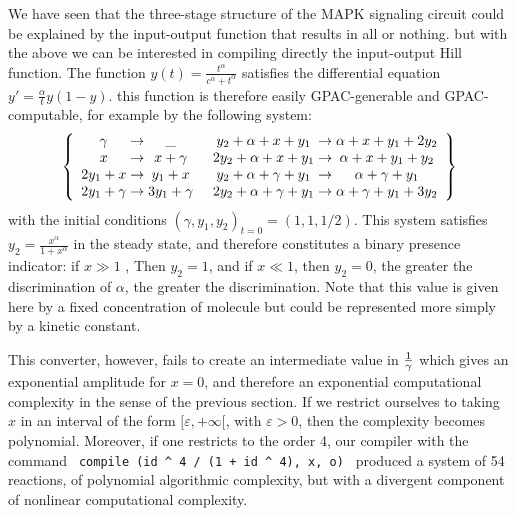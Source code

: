 \documentclass[graybox]{svmult}
\begin{document}
We have seen that the three-stage structure of the MAPK signaling circuit could be explained by
the input-output function that results in all or nothing.
but with the above we can be interested in compiling directly the input-output Hill function.
The function $y(t) = \frac{t^{\alpha}}{c^{\alpha} + t^{\alpha}}$  satisfies the differential equation $y' = \frac{\alpha}{t} y(1 - y)$.
this function is therefore easily GPAC-generable and GPAC-computable, for example by the following system:
$$
\left\{
\begin{array}{c @{\;\to\;} c}
	\gamma & \_ \\
	x & x + \gamma \\
	2y_1 + x & y_1 + x \\
	2y_1 + \gamma & 3y_1 + \gamma \\
\end{array}
\right.
\left.
\begin{array}{c @{\;\to\;} c}
	y_2 + \alpha + x + y_1 & \alpha + x + y_1 + 2y_2 \\
	2y_2 + \alpha + x + y_1 & \alpha + x + y_1 + y_2 \\
	y_2 + \alpha + \gamma + y_1 & \alpha + \gamma + y_1 \\
	2y_2 + \alpha + \gamma + y_1 & \alpha + \gamma + y_1 + 3y_2 \\
\end{array}
\right\}
$$
with the initial conditions $ (\gamma, y_1, y_2) _{t = 0} = (1, 1, 1/2) $.
This system satisfies $y_2 = \frac{x^{\alpha}}{1 + x^{\alpha}}$ in the steady state, and therefore constitutes a binary presence indicator:
if $ x \gg 1 $ , Then $ y_2 = 1 $, and if $ x \ll 1 $, then $ y_2 = 0 $, the greater the discrimination of $ \alpha $, the greater the discrimination.
Note that this value is given here by a fixed concentration of molecule but could be represented more simply by a kinetic constant.

This converter, however, fails to create an intermediate value in $ 1 \over \gamma $ which gives an exponential amplitude for $ x = 0 $,
and therefore an exponential computational complexity in the sense of the previous section.
If we restrict ourselves to taking $ x $ in an interval of the form
$ [\varepsilon, + \infty [$, with $ \varepsilon> 0 $, then the complexity becomes polynomial.
Moreover, if one restricts to the order 4, our compiler with the command \verb| compile (id ^ 4 / (1 + id ^ 4), x, o) |
produced a system of 54 reactions,
of polynomial algorithmic complexity, but with a divergent component of nonlinear computational complexity.
\end{document}
